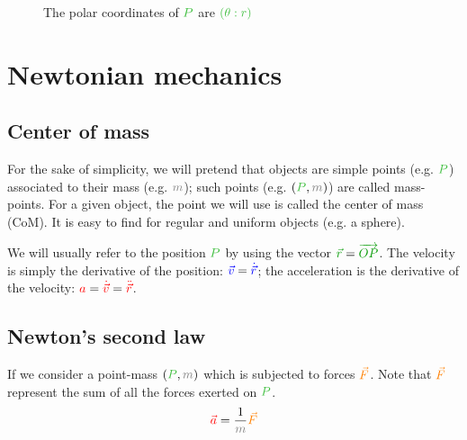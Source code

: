 \begin{figure}[H]
\centering
{}
\caption{The polar coordinates of $\posit{P}$ are $\posit{(\theta:r)}$}
\end{figure}



\section{Newtonian mechanics}


\subsection{Center of mass}

For the sake of simplicity, we will pretend that objects are simple points
(e.g. $\posit{P}$) associated to their mass (e.g. $\mass{m}$); such points
(e.g. $(\posit{P},\mass{m})$) are called mass-points. For a given object,
the point we will use is called the center of mass (CoM). It is easy to
find for regular and uniform objects (e.g. a sphere).

We will usually refer to the position $\posit{P}$ by using the vector
$\dist{\vec r} = \dist{\overrightarrow{OP}}$. The velocity is simply
the derivative of the position: $\textcolor{blue}{\vec v} = \textcolor{blue}{\dot{\vec
r}}$; the acceleration is the derivative of the velocity: $\textcolor{red}{a} =
\textcolor{red}{\dot{\vec v}} = \textcolor{red}{\ddot{\vec r}}$.


\subsection{Newton's second law}

If we consider a point-mass $(\posit{P}, \mass{m})$ which is subjected
to forces $\textcolor{orange}{\vec F}$. Note that $\textcolor{orange}{\vec F}$ represent the
sum of all the forces exerted on $\posit{P}$.
\[
\accel{\vec a} = \frac 1 {\mass{m}} \force{\vec F}
\]

